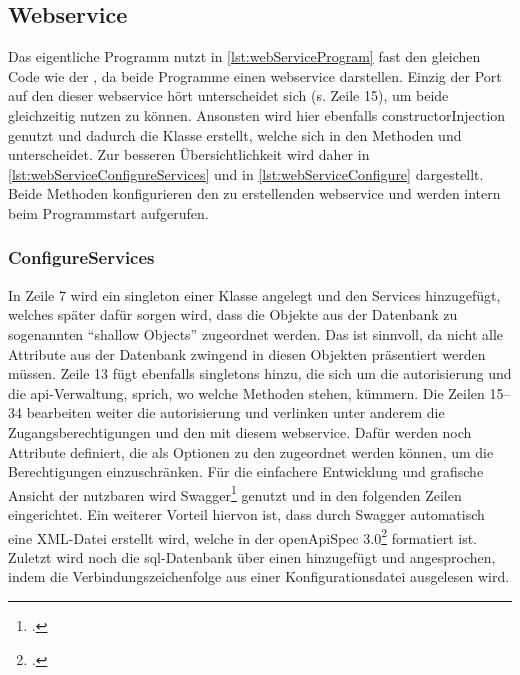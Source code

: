 \subsection{Webservice}\label{subsec:webservice}

	Das eigentliche Programm nutzt in \vref{lst:webServiceProgram} fast
	den gleichen Code wie der ,
	da beide Programme einen \gls{webservice} darstellen.
	Einzig der Port auf den dieser \gls{webservice} hört unterscheidet sich (s. Zeile 15),
	um beide gleichzeitig nutzen zu können.
	Ansonsten wird hier ebenfalls \gls{constructorInjection} genutzt
	und dadurch die Klasse  erstellt,
	welche sich in den Methoden  und  unterscheidet.
	Zur besseren Übersichtlichkeit wird daher 
	in \vref{lst:webServiceConfigureServices}
	und  in \vref{lst:webServiceConfigure} dargestellt.
	Beide Methoden konfigurieren den zu erstellenden \gls{webservice}
	und werden intern beim Programmstart aufgerufen.

	\subsubsection{ConfigureServices}\label{subsubsec:configureservices}
		In Zeile 7 wird ein \gls{singleton} einer  Klasse angelegt
		und den Services hinzugefügt,
		welches später dafür sorgen wird,
		dass die Objekte aus der Datenbank zu sogenannten \enquote{shallow Objects} zugeordnet werden.
		Das ist sinnvoll,
		da nicht alle Attribute aus der Datenbank zwingend in diesen Objekten präsentiert werden müssen.
		Zeile 13 fügt ebenfalls \glspl{singleton} hinzu,
		die sich um die \gls{autorisierung} und die \gls{api}-Verwaltung,
		sprich, wo welche Methoden stehen, kümmern.
		Die Zeilen 15--34 bearbeiten weiter die \gls{autorisierung} und
		verlinken unter anderem die Zugangsberechtigungen
		und den  mit diesem \gls{webservice}.
		Dafür werden noch Attribute definiert,
		die als Optionen zu den \httpMethoden{} zugeordnet werden können,
		um die Berechtigungen einzuschränken.
		Für die einfachere Entwicklung und grafische Ansicht der nutzbaren \httpMethoden{} wird
		Swagger\footcite[S.][]{smartbear_2022} genutzt und in den folgenden Zeilen eingerichtet.
		Ein weiterer Vorteil hiervon ist,
		dass durch Swagger automatisch eine XML-Datei erstellt wird,
		welche in der \gls{openApiSpec} 3.0\footcite[S.][]{miller_whitlock_gardiner_ralphson_ratovsky_sarid_2017} formatiert ist.
		Zuletzt wird noch die \gls{sql}-Datenbank über einen  hinzugefügt und angesprochen,
		indem die Verbindungszeichenfolge aus einer Konfigurationsdatei ausgelesen wird.


